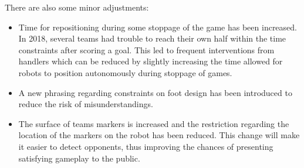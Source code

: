 \documentclass{article}
\begin{document}
There are also some minor adjustments:

\begin{itemize}
\item Time for repositioning during some stoppage of the game has been increased.
  In 2018, several teams had trouble to reach their own half within the time
  constraints after scoring a goal.
  This led to frequent interventions from handlers which can be reduced by
  slightly increasing the time allowed for robots to position autonomously
  during stoppage of games.
\item A new phrasing regarding constraints on foot design has been introduced to
  reduce the risk of misunderstandings.
\item The surface of teams markers is increased and the restriction regarding the
  location of the markers on the robot has been reduced.
  This change will make it easier to detect opponents,
  thus improving the chances of presenting satisfying gameplay to the public.
\end{itemize}

\newpage

\printbibliography
\end{document}
